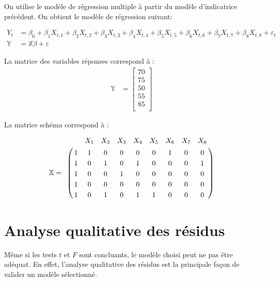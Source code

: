 \documentclass[11pt,french]{report}
\begin{document}
On utilise le modèle de régression multiple à partir du modèle d'indicatrice précédent. On obtient le modèle de régression suivant:

\begin{align*}
Y_t &= \beta_0 + \beta_1X_{t,1} + \beta_2X_{t,2} + \beta_3X_{t,3} 
+ \beta_4X_{t,4} + \beta_5X_{t,5} + \beta_6X_{t,6} + \beta_7X_{t,7} + \beta_8X_{t,8} + \varepsilon_t \\
\mathbb{Y} &= \mathbb{X}\mathbb{\beta} + \mathbb{\varepsilon}
\end{align*}

La matrice des variables réponses correspond à :
\begin{align*}
\mathbb{Y} &= 
\begin{bmatrix}
70 \\
75 \\
50 \\
55 \\
85 \\
\end{bmatrix}
\end{align*}

La matrice schéma correspond à :

\begin{align*}
\mathbb{X}
=
\bordermatrix { 
& &  X_1  & X_2 & X_3 & X_4 & X_5  & X_6 & X_7 & X_8 \cr 
& 1 & 1 & 0 & 0 & 0 & 0 & 1 & 0 & 0 \cr 
& 1 & 0 & 1 & 0 & 1 & 0 & 0 & 0 & 1 \cr 
& 1 & 0 & 0 & 1 & 0 & 0 & 0 & 0 & 0 \cr 
& 1 & 0 & 0 & 0 & 0 & 0 & 0 & 0 & 0 \cr 
& 1 & 0 & 1 & 0 & 1 & 1 & 0 & 0 & 0 \cr 
}
\end{align*}

\section{Analyse qualitative des résidus}
Même si les tests $t$ et $F$ sont concluants, le modèle choisi peut ne pas être adéquat. En effet, l'analyse qualitative des résidus est la principale façon de valider un modèle sélectionné. 
\end{document}
